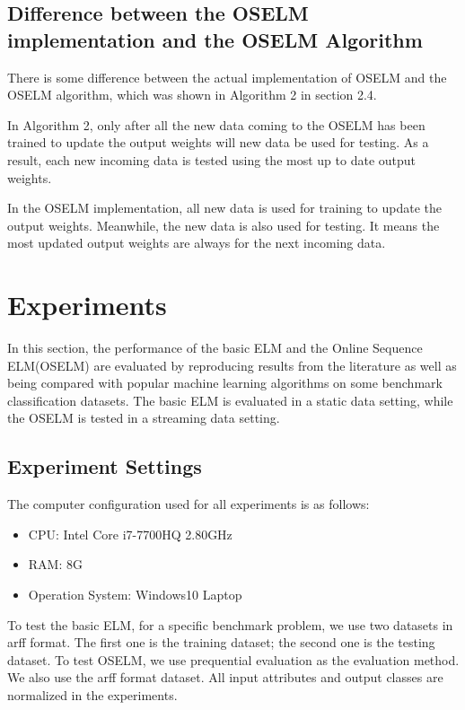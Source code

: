 \documentclass[a4paper, 14pt]{extarticle}
\begin{document}
\subsection{Difference between the OSELM implementation and the OSELM Algorithm}
\par There is some difference between the actual implementation of OSELM and the OSELM algorithm, which was shown in Algorithm 2 in section 2.4. 
\par In Algorithm 2, only after all the new data coming to the OSELM has been trained to update the output weights will new data be used for testing. As a result, each new incoming data is tested using the most up to date output weights. 
\par In the OSELM implementation, all new data is used for training to update the output weights. Meanwhile, the new data is also used for testing. It means the most updated output weights are always for the next incoming data. 
\newpage
\section{Experiments}
In this section, the performance of the basic ELM and the Online Sequence ELM(OSELM) are evaluated by reproducing results from the literature as well as being compared with popular machine learning algorithms on some benchmark 
classification datasets. The basic ELM is evaluated in a static data setting, while the OSELM is tested in a streaming data setting.
\subsection{Experiment Settings}
\par 
The computer configuration used for all experiments is as follows:
\begin{itemize}

    \item CPU: Intel Core i7-7700HQ 2.80GHz
    \item RAM: 8G
    \item Operation System: Windows10 Laptop

\end{itemize}
\par To test the basic ELM, for a specific benchmark problem, we use two datasets in arff format. The first one is the training dataset; the second one is the testing dataset. To test OSELM, we use prequential evaluation as the evaluation method. We also use the arff format dataset. All input attributes and output classes are normalized in the experiments. 
\end{document}
